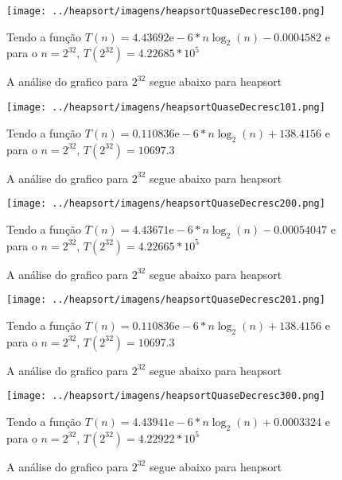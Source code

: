 \documentclass[12pt,a4paper,twoside]{report}
\begin{document}


\begin{figure}[ht]
\centering \texttt{[image: ../heapsort/imagens/heapsortQuaseDecresc100.png]}
\caption{A análise do grafico para $2^{32}$ segue abaixo para heapsort}

Tendo a função $T(n) = 4.43692\mathrm{e}-6*n\log_{2}(n)-0.0004582$ e para o $n =2^{32}$, $T(2^{32}) = 4.22685*10^{5}$
\label{fig:heapsortQuaseDecresc100}
\end{figure}

\begin{figure}[ht]
\centering \texttt{[image: ../heapsort/imagens/heapsortQuaseDecresc101.png]}
\caption{A análise do grafico para $2^{32}$ segue abaixo para heapsort}

Tendo a função $T(n) = 0.110836\mathrm{e}-6*n\log_{2}(n)+138.4156$ e para o $n =2^{32}$, $T(2^{32}) = 10697.3$
\label{fig:heapsortQuaseDecresc101}
\end{figure}




\begin{figure}[ht]
\centering \texttt{[image: ../heapsort/imagens/heapsortQuaseDecresc200.png]}
\caption{A análise do grafico para $2^{32}$ segue abaixo para heapsort}

Tendo a função $T(n) = 4.43671\mathrm{e}-6*n\log_{2}(n)-0.00054047$ e para o $n =2^{32}$, $T(2^{32}) = 4.22665*10^{5}$
\label{fig:heapsortQuaseDecresc200}
\end{figure}

\begin{figure}[ht]
\centering \texttt{[image: ../heapsort/imagens/heapsortQuaseDecresc201.png]}
\caption{A análise do grafico para $2^{32}$ segue abaixo para heapsort}

Tendo a função $T(n) = 0.110836\mathrm{e}-6*n\log_{2}(n)+138.4156$ e para o $n =2^{32}$, $T(2^{32}) = 10697.3$
\label{fig:heapsortQuaseDecresc201}
\end{figure}

\clearpage


\begin{figure}[ht]
\centering \texttt{[image: ../heapsort/imagens/heapsortQuaseDecresc300.png]}
\caption{A análise do grafico para $2^{32}$ segue abaixo para heapsort}

Tendo a função $T(n) = 4.43941\mathrm{e}-6*n\log_{2}(n)+0.0003324$ e para o $n =2^{32}$, $T(2^{32}) = 4.22922*10^{5}$
\label{fig:heapsortQuaseDecresc300}
\end{figure}
\end{document}
